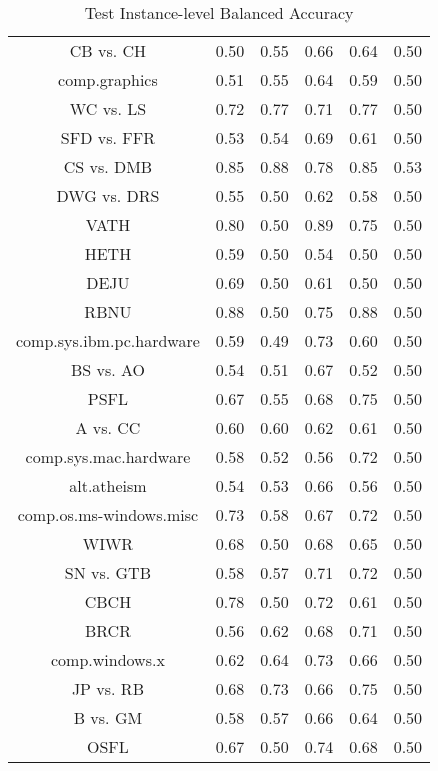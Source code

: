 \begin{table}[ht]\footnotesize
\centering
\caption{Test Instance-level Balanced Accuracy}
\label{Table:mil_test_instance_balanced_accuracy}
\begin{tabular}{|c|c|c|c|c|c|}
  \hline
          &\MIB{}  &  \rB{}  &  \MB{}  &  \AB{}  &  \AuerB{}\\ 
  \hline
CB vs. CH  &  0.50   &  0.55   &  0.66   &  0.64   &  0.50 \\ 
comp.graphics  &  0.51   &  0.55   &  0.64   &  0.59   &  0.50 \\ 
WC vs. LS  &  0.72   &  0.77   &  0.71   &  0.77   &  0.50 \\ 
SFD vs. FFR  &  0.53   &  0.54   &  0.69   &  0.61   &  0.50 \\ 
CS vs. DMB  &  0.85   &  0.88   &  0.78   &  0.85   &  0.53 \\ 
DWG vs. DRS  &  0.55   &  0.50   &  0.62   &  0.58   &  0.50 \\ 
VATH  &  0.80   &  0.50   &  0.89   &  0.75   &  0.50 \\ 
HETH  &  0.59   &  0.50   &  0.54   &  0.50   &  0.50 \\ 
DEJU  &  0.69   &  0.50   &  0.61   &  0.50   &  0.50 \\ 
RBNU  &  0.88   &  0.50   &  0.75   &  0.88   &  0.50 \\ 
comp.sys.ibm.pc.hardware  &  0.59   &  0.49   &  0.73   &  0.60   &  0.50 \\ 
BS vs. AO  &  0.54   &  0.51   &  0.67   &  0.52   &  0.50 \\ 
PSFL  &  0.67   &  0.55   &  0.68   &  0.75   &  0.50 \\ 
A vs. CC  &  0.60   &  0.60   &  0.62   &  0.61   &  0.50 \\ 
comp.sys.mac.hardware  &  0.58   &  0.52   &  0.56   &  0.72   &  0.50 \\ 
alt.atheism  &  0.54   &  0.53   &  0.66   &  0.56   &  0.50 \\ 
comp.os.ms-windows.misc  &  0.73   &  0.58   &  0.67   &  0.72   &  0.50 \\ 
WIWR  &  0.68   &  0.50   &  0.68   &  0.65   &  0.50 \\ 
SN vs. GTB  &  0.58   &  0.57   &  0.71   &  0.72   &  0.50 \\ 
CBCH  &  0.78   &  0.50   &  0.72   &  0.61   &  0.50 \\ 
BRCR  &  0.56   &  0.62   &  0.68   &  0.71   &  0.50 \\ 
comp.windows.x  &  0.62   &  0.64   &  0.73   &  0.66   &  0.50 \\ 
JP vs. RB  &  0.68   &  0.73   &  0.66   &  0.75   &  0.50 \\ 
B vs. GM  &  0.58   &  0.57   &  0.66   &  0.64   &  0.50 \\ 
OSFL  &  0.67   &  0.50   &  0.74   &  0.68   &  0.50 \\ 
\hline
 \end{tabular}
  \end{table}


